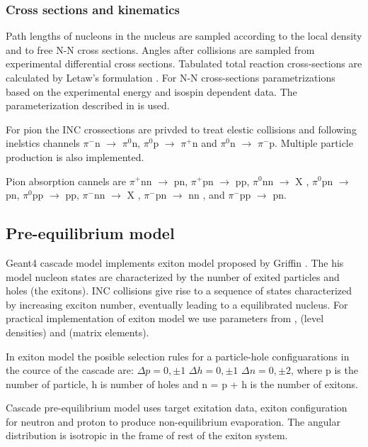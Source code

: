 \subsubsection{Cross sections and kinematics}

Path lengths of nucleons in the nucleus are sampled according to the local density and to free N-N cross sections.
Angles after collisions are sampled from experimental differential cross sections.
Tabulated total reaction cross-sections are calculated by Letaw's formulation \cite{letaw83, letaw93, pearlstein89}.
For N-N cross-sections parametrizations based on the experimental energy and isospin dependent data. 
The parameterization described in \cite{barashenkov72} is used. 

For pion the INC crossections are privded to treat elestic collisions and following inelstics channels
$\pi^{-}$n $\rightarrow$ $\pi^{0}$n, $\pi^{0}$p $\rightarrow$ $\pi^{+}$n and $\pi^{0}$n $\rightarrow$ $\pi^{-}$p.
Multiple particle production is also implemented.

Pion absorption cannels are 
$\pi^{+}$nn $\rightarrow$ pn, $\pi^{+}$pn $\rightarrow$ pp, 
$\pi^{0}$nn $\rightarrow$ X , $\pi^{0}$pn $\rightarrow$ pn,      $\pi^{0}$pp $\rightarrow$ pp, 
$\pi^{-}$nn $\rightarrow$ X , $\pi^{-}$pn $\rightarrow$ nn , and $\pi^{-}$pp $\rightarrow$ pn.
\subsection{Pre-equilibrium model}

{\sc Geant4} cascade model implements exiton model proposed by Griffin \cite{griffin66, griffin67}.
The his model nucleon states are characterized by the number of exited particles and holes (the exitons).
INC collisions give rise to a sequence of states characterized by increasing exciton number, eventually leading to a equilibrated nucleus.
For practical implementation of exiton model we use parameters  from \cite{ribansky73}, (level densities) and \cite{kalbach78}  
(matrix elements).

In exiton model the posible selection rules for a particle-hole configuarations in the cource of the cascade are:
$\Delta p = 0, \pm 1$  $\Delta h = 0, \pm 1$  $\Delta n = 0, \pm 2$,
where p is the number of particle, h is number of holes and n = p + h is the number of exitons. 

Cascade pre-equilibrium model uses target exitation data, 
exiton configuration for neutron and proton to produce non-equilibrium evaporation.
The angular distribution is isotropic in the frame of rest of the exiton system.

